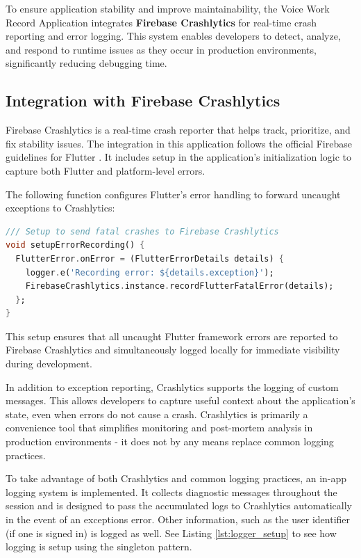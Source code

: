 \documentclass[
  digital,     %
  oneside,     %
  nosansbold,  %
  nocolorbold, %
  lof,         %
  lot,         %
]{fithesis4}
\begin{document}
To ensure application stability and improve maintainability, the Voice Work Record Application integrates \textbf{Firebase Crashlytics} for real-time crash reporting and error logging. This system enables developers to detect, analyze, and respond to runtime issues as they occur in production environments, significantly reducing debugging time.

\subsection{Integration with Firebase Crashlytics}

Firebase Crashlytics is a real-time crash reporter that helps track, prioritize, and fix stability issues. The integration in this application follows the official Firebase guidelines for Flutter \cite{firebaseCrashlyticsStart}. It includes setup in the application’s initialization logic to capture both Flutter and platform-level errors.

The following function configures Flutter’s error handling to forward uncaught exceptions to Crashlytics:

\begin{lstlisting}[language=Dart, caption={Firebase Crashlytics configuration side of the app}, label={lst:error_recording}, floatplacement=H, showstringspaces=false]
/// Setup to send fatal crashes to Firebase Crashlytics
void setupErrorRecording() {
  FlutterError.onError = (FlutterErrorDetails details) {
    logger.e('Recording error: ${details.exception}');
    FirebaseCrashlytics.instance.recordFlutterFatalError(details);
  };
}
\end{lstlisting}

This setup ensures that all uncaught Flutter framework errors are reported to Firebase Crashlytics and simultaneously logged locally for immediate visibility during development.

In addition to exception reporting, Crashlytics supports the logging of custom messages. This allows developers to capture useful context about the application’s state, even when errors do not cause a crash. Crashlytics is primarily a convenience tool that simplifies monitoring and post-mortem analysis in production environments - it does not by any means replace common logging practices.

To take advantage of both Crashlytics and common logging practices, an in-app logging system is implemented. It collects diagnostic messages throughout the session and is designed to pass the accumulated logs to Crashlytics automatically in the event of an exceptions error. Other information, such as the user identifier (if one is signed in) is logged as well. See Listing \ref{lst:logger_setup} to see how logging is setup using the singleton pattern.
\end{document}
